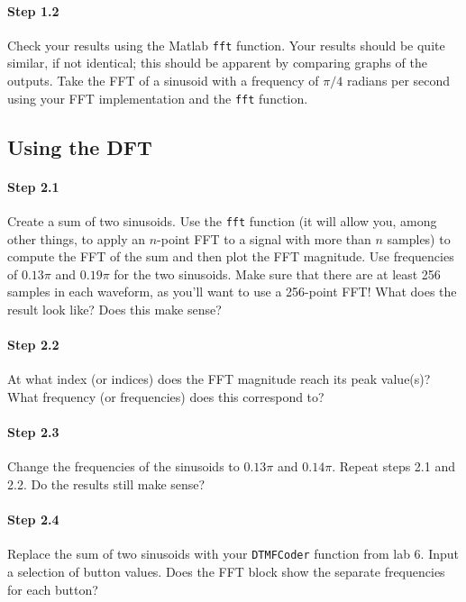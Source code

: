 \paragraph{Step 1.2} 
Check your results using the Matlab \verb|fft| function. Your results
should be quite similar, if not identical; this should be apparent by
comparing graphs of the outputs. Take the FFT of a sinusoid with a
frequency of $\pi/4$ radians per second using your FFT implementation
and the \verb|fft| function.



\subsection{Using the DFT}

\paragraph{Step 2.1} 
Create a sum of two sinusoids. Use the \verb|fft| function (it will
allow you, among other things, to apply an $n$-point FFT to a signal
with more than $n$ samples) to compute the FFT of the sum and then
plot the FFT magnitude. Use frequencies of $0.13\pi$ and $0.19\pi$ for
the two sinusoids. Make sure that there are at least 256 samples in
each waveform, as you'll want to use a 256-point FFT! What does the
result look like? Does this make sense?


\paragraph{Step 2.2} At what index (or indices) does the FFT magnitude
reach its peak value(s)? What frequency (or frequencies) does this
correspond to?


\paragraph{Step 2.3} Change the frequencies of the sinusoids to
$0.13\pi$ and $0.14\pi$. Repeat steps 2.1 and 2.2. Do the results
still make sense?


\paragraph{Step 2.4} Replace the sum of two sinusoids with your
\verb|DTMFCoder| function from lab 6. Input a selection of button
values. Does the FFT block show the separate frequencies for each
button?



